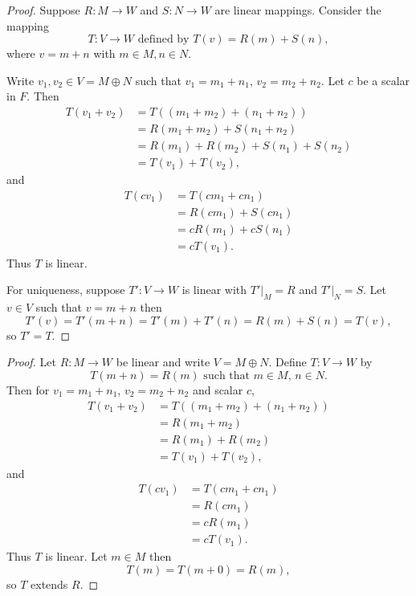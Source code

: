 \begin{proof}
    Suppose $R : M \longrightarrow W$ and $S : N \longrightarrow W$
    are linear mappings.
    Consider the mapping 
    \[T : V \longrightarrow W \text{ defined by } T(v) = R(m) + S(n),\]
    where $v = m + n$ with $m \in M, n \in N$.

    Write $v_1, v_2 \in V = M \oplus N$ such that 
    $v_1 = m_1 + n_1$, $v_2 = m_2 + n_2$.
    Let $c$ be a scalar in $F$.
    Then 
    \begin{align*}
        T(v_1 + v_2) 
        &= T((m_1 + m_2) + (n_1 + n_2)) \\
        &= R(m_1 + m_2) + S(n_1 + n_2) \\
        &= R(m_1) + R(m_2) + S(n_1) + S(n_2) \\
        &= T(v_1) + T(v_2),
    \end{align*}
    and
    \begin{align*}
        T(cv_1) 
        &= T(cm_1 + cn_1) \\
        &= R(cm_1) + S(cn_1) \\
        &= cR(m_1) + cS(n_1) \\
        &= cT(v_1).
    \end{align*}
    Thus $T$ is linear.

    For uniqueness, suppose $T' : V \to W$ is linear with 
    $T'|_M = R$ and $T'|_N = S$.
    Let $v \in V$ such that $v = m + n$ then
    \[
        T'(v) = T'(m+n) = T'(m) + T'(n) = R(m) + S(n) = T(v),
    \]
    so $T' = T$.
\end{proof}

\begin{proof}
    Let $R : M \longrightarrow W$ be linear and write $V = M \oplus N$.
    Define $T : V \longrightarrow W$ by
    \[
        T(m+n) = R(m) \text{ such that } m \in M,\, n \in N.
    \]
    Then for $v_1 = m_1+n_1$, $v_2 = m_2+n_2$ and scalar $c$,
    \begin{align*}
        T(v_1+v_2) &= T((m_1+m_2)+(n_1+n_2)) \\
                   &= R(m_1+m_2) \\
                   &= R(m_1)+R(m_2) \\
                   &= T(v_1)+T(v_2),
    \end{align*}
    and
    \begin{align*}
        T(cv_1) &= T(cm_1+cn_1) \\
                &= R(cm_1) \\
                &= cR(m_1) \\
                &= cT(v_1).
    \end{align*}
    Thus $T$ is linear. Let $m \in M$ then
    \[
        T(m) = T(m+0) = R(m),
    \]
    so $T$ extends $R$.
\end{proof}

